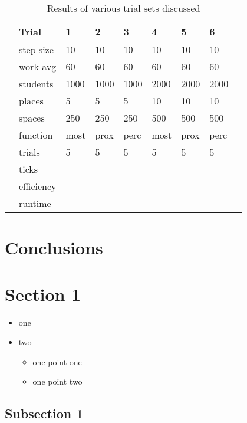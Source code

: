 \documentclass[11pt]{article} %
\begin{document}
\begin{table}[]
\centering
\begin{tabular}{l|l|lllllll}
 & Trial & 1 & 2 & 3 & 4 & 5 & 6 & \\ \hline
  \parbox[t]{2mm}{} & step size & 10  & 10  & 10 & 10 & 10 & 10  \\
 & work avg & 60 &  60 	& 60	& 60 & 60 & 60 \\
 & students & 1000 & 1000 & 1000 & 2000 & 2000 & 2000 \\
 & places & 5 & 5 & 5 & 10 & 10 & 10 \\
 & spaces & 250 & 250 & 250 & 500 & 500 & 500 \\
 & function & most & prox & perc & most & prox & perc \\
 & trials & 5 & 5 & 5 & 5 & 5 & 5 \\ \hline
\parbox[t]{2mm}{} & ticks & & & & & & \\
 & efficiency & & & & & & \\
  & runtime & & &  & & &
\end{tabular}
\caption{Results of various trial sets discussed}
\end{table}




\section{Conclusions}





\section{Section 1}

\begin{itemize}
\item one
\item two
  \begin{itemize}
  \item one point one
  \item one point two
  \end{itemize}
\end{itemize}

\subsection{Subsection 1}
\end{document}
